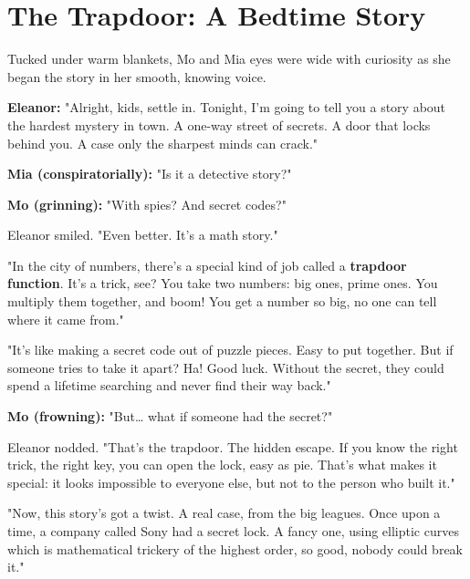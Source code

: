 \chapter{The Trapdoor: A Bedtime Story}
Tucked under warm blankets, Mo and Mia eyes were wide with curiosity as she began the story in her smooth, knowing voice.

\bigskip
\textbf{Eleanor:} 
"Alright, kids, settle in. Tonight, I’m going to tell you a story about the hardest mystery in town. A one-way street of secrets. A door that locks behind you. A case only the sharpest minds can crack."

\medskip

\textbf{Mia (conspiratorially):} "Is it a detective story?"

\textbf{Mo (grinning):} "With spies? And secret codes?"

\medskip

Eleanor smiled. "Even better. It’s a math story."

"In the city of numbers, there’s a special kind of job called a \textbf{trapdoor function}. It’s a trick, see? You take two numbers: big ones, prime ones. You multiply them together, and boom! You get a number so big, no one can tell where it came from."

"It’s like making a secret code out of puzzle pieces. Easy to put together. But if someone tries to take it apart? Ha! Good luck. Without the secret, they could spend a lifetime searching and never find their way back."

\medskip

\textbf{Mo (frowning):} "But… what if someone had the secret?"

Eleanor nodded. "That’s the trapdoor. The hidden escape. If you know the right trick, the right key, you can open the lock, easy as pie. That’s what makes it special: it looks impossible to everyone else, but not to the person who built it."

\smallskip

"Now, this story’s got a twist. A real case, from the big leagues. Once upon a time, a company called Sony had a secret lock. A fancy one, using elliptic curves which is mathematical trickery of the highest order, so good, nobody could break it."


